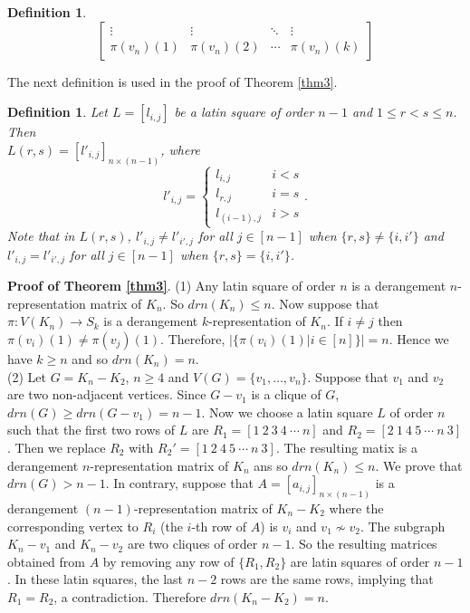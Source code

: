 \documentclass[11pt,letterpaper]{article}
\newtheorem{definition}[theorem]{Definition}
\begin{document}
{\begin{definition}
\[\begin{bmatrix}
   \vdots & \vdots & \ddots & \vdots \\
   \pi(v_n)(1) & \pi(v_n)(2) & \cdots & \pi(v_n)(k)
\end{bmatrix}
\]
\end{definition}
The next definition is used in the proof of Theorem \ref{thm3}.
\begin{definition}
Let $L=[l_{i,j}]$ be a latin square of order $n-1$ and $1\leq r<s\leq n$. Then\\
$L(r,s)=[l'_{i,j}]_{n\times (n-1)}$, where
\[l'_{i,j}=\begin{cases}
 l_{i,j}&i<s\\ l_{r,j} & i=s\\ l_{(i-1),j}&i>s
\end{cases}.\]
Note that in $L(r,s)$, $l'_{i,j}\neq l'_{i',j}$ for all $j\in[n-1]$ when $\{r,s\}\neq\{i,i'\}$ and $l'_{i,j}= l'_{i',j}$ for all $j\in[n-1]$ when $\{r,s\}=\{i,i'\}$.
\end{definition}
\textbf{Proof of Theorem \ref{thm3}}. (1) Any latin square of order $n$ is a derangement $n$-representation matrix of $K_n$. So $drn(K_n)\leq n$. Now suppose that $\pi:V(K_n)\rightarrow S_k$ is a derangement $k$-representation of $K_n$. If $i\neq j$ then $\pi(v_i)(1)\neq \pi(v_j)(1)$. Therefore,
$|\{\pi(v_i)(1)| i\in[n]\}|=n$. Hence we have $k\geq n$ and so $drn(K_n)=n$.\\
(2) Let $G=K_n-K_2$, $n\geq4$ and  $V(G)=\{v_1,\ldots,v_n\}$. Suppose that $v_{1} $ and $v_2$ are two non-adjacent vertices. Since $G-v_1$ is a clique of $G$, $drn(G)\geq drn(G-v_1)=n-1$. Now we choose a latin square $L$ of order $n$ such that the first two rows of $L$ are $R_1=[1\ 2\ 3\ 4\ \cdots\ n]$ and $R_2=[2\ 1\ 4\ 5\ \cdots \ n\ 3]$. Then we replace $R_2$ with $R_2'=[1\ 2\ 4\ 5\ \cdots \ n\ 3]$. The resulting matix is a derangement $n$-representation matrix of $K_n$ ans so $drn(K_n)\leq n$. We prove that $drn(G)>n-1$. In contrary, suppose that $A=[a_{i,j}]_{n\times(n-1)}$ is a derangement $(n-1)$-representation matrix of $K_n-K_2$ where the corresponding vertex to $R_i$ (the $i$-th row of $A$) is $v_i$ and $v_1\nsim v_2$. The subgraph $K_n-v_1$ and $K_n-v_2$ are two cliques of order $n-1$. So the resulting matrices obtained from $A$ by removing any row of $\{R_1,R_2\}$ are latin squares of order $n-1$. In these latin squares, the last $n-2$ rows are the same rows, implying that $R_1=R_2$, a contradiction. Therefore $drn(K_n-K_2)=n$.\\
}
\end{document}
